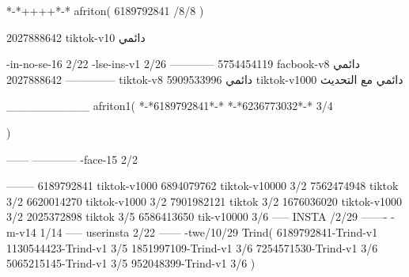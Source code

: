 *-*++++*-*
afriton(
6189792841 /8/8
)

2027888642 tiktok-v10
دائمي

-in-no-se-16 2/22
-lse-ins-v1 2/26
------------
5754454119 facbook-v8
دائمي
--------------
2027888642 tiktok-v8
دائمي
5909533996 tiktok-v1000
دائمي مع التحديث

__________
afriton1(
*-*6189792841*-*
*-*6236773032*-* 3/4

)


------
------------
-face-15 2/2

--------
6189792841 tiktok-v1000
6894079762 tiktok-v10000 3/2
7562474948 tiktok 3/2
6620014270 tiktok-v1000 3/2
7901982121 tiktok 3/2
1676036020 tiktok-v1000 3/2
2025372898 tiktok  3/5
6586413650 tik-v10000 3/6
-----
 INSTA /2/29
-------
-m-v14 1/14
-----
userinsta 2/22
------
-twe/10/29
Trind(
6189792841-Trind-v1 
1130544423-Trind-v1 3/5
1851997109-Trind-v1 3/6
7254571530-Trind-v1 3/6
5065215145-Trind-v1 3/5
952048399-Trind-v1 3/6
)
